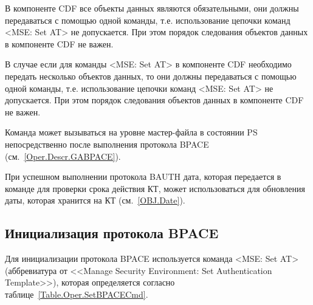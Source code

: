 В компоненте CDF все объекты данных являются обязательными, 
они должны передаваться с помощью одной команды, 
т.е. использование цепочки команд <MSE: Set AT> не допускается. 
При этом порядок следования объектов данных в компоненте CDF не важен. 

В случае если для команды <MSE: Set AT> в компоненте CDF необходимо 
передать несколько объектов данных, то они должны передаваться с помощью 
одной команды, т.е. использование цепочки команд <MSE: Set AT> не 
допускается. При этом порядок следования объектов данных в компоненте CDF 
не важен. 
\fi

Команда может вызываться на уровне мастер-файла в состоянии PS 
непосредственно после выполнения протокола BPACE (см.~\ref{Oper.Descr.GABPACE}).


При успешном выполнении протокола BAUTH дата, которая передается в команде 
для проверки срока действия КТ, может использоваться для обновления даты, 
которая хранится на КТ (см.~\ref{OBJ.Date}). 


\subsection{Инициализация протокола BPACE}
\label{Oper.Descr.SetBPACE}

Для инициализации протокола BPACE используется команда
<MSE: Set AT> (аббревиатура от <<Manage Security Environment: Set 
Authentication Template>>), которая определяется согласно 
таблице~\ref{Table.Oper.SetBPACECmd}.

